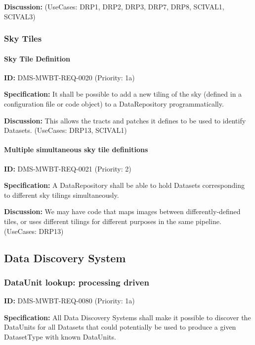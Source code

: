 \documentclass[SE,toc,lsstdraft]{lsstdoc}
\begin{document}
\textbf{Discussion:}
(UseCases: DRP1, DRP2, DRP3, DRP7, DRP8, SCIVAL1, SCIVAL3)

\subsubsection{Sky Tiles}

\paragraph{Sky Tile Definition}\hfill  %

\label{DMS-MWBT-REQ-0020}
\textbf{ID:} DMS-MWBT-REQ-0020 (Priority: 1a)

\textbf{Specification:}
It shall be possible to add a new tiling of the sky (defined in a configuration file or code object) to a DataRepository programmatically.

\textbf{Discussion:}
This allows the tracts and patches it defines to be used to identify Datasets. (UseCases: DRP13, SCIVAL1)

\paragraph{Multiple simultaneous sky tile definitions}\hfill  %

\label{DMS-MWBT-REQ-0021}
\textbf{ID:} DMS-MWBT-REQ-0021 (Priority: 2)

\textbf{Specification:}
A DataRepository shall be able to hold Datasets corresponding to different sky tilings simultaneously.

\textbf{Discussion:}
We may have code that maps images between differently-defined tiles, or uses different tilings for different purposes in the same pipeline. (UseCases: DRP13)

\subsection{Data Discovery System}

\subsubsection{DataUnit lookup: processing driven}

\label{DMS-MWBT-REQ-0080}
\textbf{ID:} DMS-MWBT-REQ-0080 (Priority: 1a)

\textbf{Specification:}
All Data Discovery Systems shall make it possible to discover the DataUnits for all Datasets that could potentially be used to produce a given DatasetType with known DataUnits.
\end{document}
